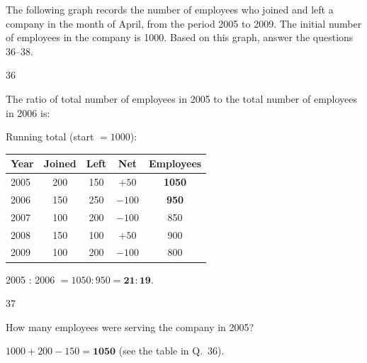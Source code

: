 \begin{context}
The following graph records the number of employees who joined and left a company in the month of April, from the period 2005 to 2009. The initial number of employees in the company is 1000. Based on this graph, answer the questions 36--38.
\begin{center}
\end{center}
\end{context}
\begin{question}{36}
{The ratio of total number of employees in 2005 to the total number of employees in 2006 is:\par}
\begin{explain}
Running total (start $=1000$):
\begin{center}\small
\begin{tabular}{lcccc}\toprule Year & Joined & Left & Net & Employees\\\midrule
2005 & 200 & 150 & $+50$ & \textbf{1050}\\ 2006 & 150 & 250 & $-100$ & \textbf{950}\\ 2007 & 100 & 200 & $-100$ & 850\\ 2008 & 150 & 100 & $+50$ & 900\\ 2009 & 100 & 200 & $-100$ & 800\\\bottomrule
\end{tabular}
\end{center}
2005 : 2006 $=1050:950=\mathbf{21:19}$.
\end{explain}
\end{question}

\begin{question}{37}
{How many employees were serving the company in 2005?\par}
\begin{explain}
$1000+200-150=\mathbf{1050}$ (see the table in Q.~36).
\end{explain}
\end{question}

